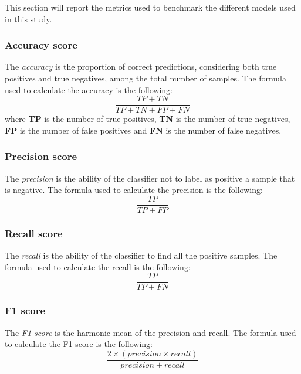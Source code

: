             This section will report the metrics used to benchmark the different models used in this study.

            \subsubsection{Accuracy score}

                The \textit{accuracy} is the proportion of correct predictions, considering both true positives and true negatives, among the total number of samples. The formula used to calculate the accuracy is the following:
                \begin{equation}
                    \frac{TP + TN}{TP + TN + FP + FN}
                \end{equation} 
                where \textbf{TP} is the number of true positives, \textbf{TN} is the number of true negatives, \textbf{FP} is the number of false positives and \textbf{FN} is the number of false negatives.

            \subsubsection{Precision score}

                The \textit{precision} is the ability of the classifier not to label as positive a sample that is negative. The formula used to calculate the precision is the following:
                \begin{equation}
                    \frac{TP}{TP + FP}
                \end{equation}

            \subsubsection{Recall score}

                The \textit{recall} is the ability of the classifier to find all the positive samples. The formula used to calculate the recall is the following:
                \begin{equation}
                    \frac{TP}{TP + FN}
                \end{equation}

            \subsubsection{F1 score}

                The \textit{F1 score} is the harmonic mean of the precision and recall. The formula used to calculate the F1 score is the following:
                \begin{equation}
                    \frac{ 2 \times (precision \times recall)}{precision + recall}
                \end{equation}

